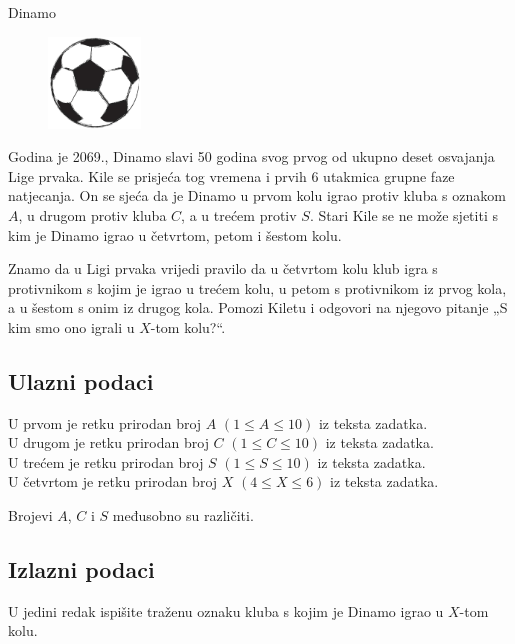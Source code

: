 \begin{statement}[
  problempoints=20,
  timelimit=1 sekunda,
  memorylimit=512 MiB,
]{Dinamo}


\setlength\intextsep{-0.1cm}
\begin{figure}
\centering
\includegraphics[width=0.22\textwidth]{img/football.png}
\end{figure}

Godina je 2069., Dinamo slavi 50 godina svog prvog od ukupno deset osvajanja
Lige prvaka. Kile se prisjeća tog vremena i prvih 6 utakmica grupne faze
natjecanja. On se sjeća da je Dinamo u prvom kolu igrao protiv kluba s oznakom
$A$, u drugom protiv kluba $C$, a u trećem protiv $S$. Stari Kile se ne može
sjetiti s kim je Dinamo igrao u četvrtom, petom i šestom kolu.

Znamo da u Ligi prvaka vrijedi pravilo da u četvrtom kolu klub igra s
protivnikom s kojim je igrao u trećem kolu, u petom s protivnikom iz prvog kola,
a u šestom s onim iz drugog kola. Pomozi Kiletu i odgovori na njegovo pitanje
„S kim smo ono igrali u $X$-tom kolu?“.

\subsection*{Ulazni podaci}
U prvom je retku prirodan broj $A$ $(1 \le A \le 10)$ iz teksta zadatka. \\
U drugom je retku prirodan broj $C$ $(1 \le C \le 10)$ iz teksta zadatka. \\
U trećem je retku prirodan broj $S$ $(1 \le S \le 10)$ iz teksta zadatka. \\
U četvrtom je retku prirodan broj $X$ $(4 \le X \le 6)$ iz teksta zadatka.

Brojevi $A$, $C$ i $S$ međusobno su različiti.

\subsection*{Izlazni podaci}
U jedini redak ispišite traženu oznaku kluba s kojim je Dinamo igrao u $X$-tom
kolu.


\end{statement}
